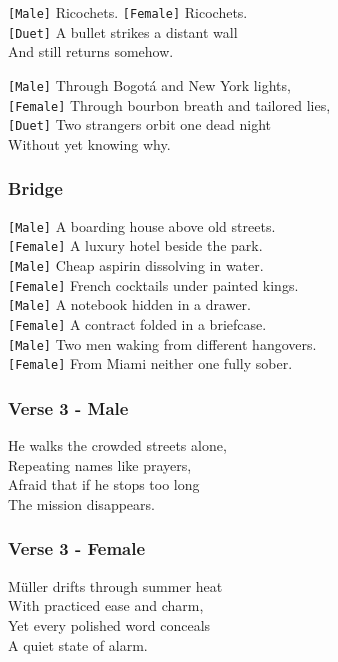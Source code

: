 \documentclass[]{article}
\begin{document}
\texttt{{[}Male{]}} Ricochets. \texttt{{[}Female{]}} Ricochets.\\
\texttt{{[}Duet{]}} A bullet strikes a distant wall\\
And still returns somehow.

\texttt{{[}Male{]}} Through Bogotá and New York lights,\\
\texttt{{[}Female{]}} Through bourbon breath and tailored lies,\\
\texttt{{[}Duet{]}} Two strangers orbit one dead night\\
Without yet knowing why.

\subsubsection{Bridge}\label{bridge-16}

\texttt{{[}Male{]}} A boarding house above old streets.\\
\texttt{{[}Female{]}} A luxury hotel beside the park.\\
\texttt{{[}Male{]}} Cheap aspirin dissolving in water.\\
\texttt{{[}Female{]}} French cocktails under painted kings.\\
\texttt{{[}Male{]}} A notebook hidden in a drawer.\\
\texttt{{[}Female{]}} A contract folded in a briefcase.\\
\texttt{{[}Male{]}} Two men waking from different hangovers.\\
\texttt{{[}Female{]}} From Miami neither one fully sober.

\subsubsection{Verse 3 - Male}\label{verse-3---male}

He walks the crowded streets alone,\\
Repeating names like prayers,\\
Afraid that if he stops too long\\
The mission disappears.

\subsubsection{Verse 3 - Female}\label{verse-3---female}

Müller drifts through summer heat\\
With practiced ease and charm,\\
Yet every polished word conceals\\
A quiet state of alarm.
\end{document}
